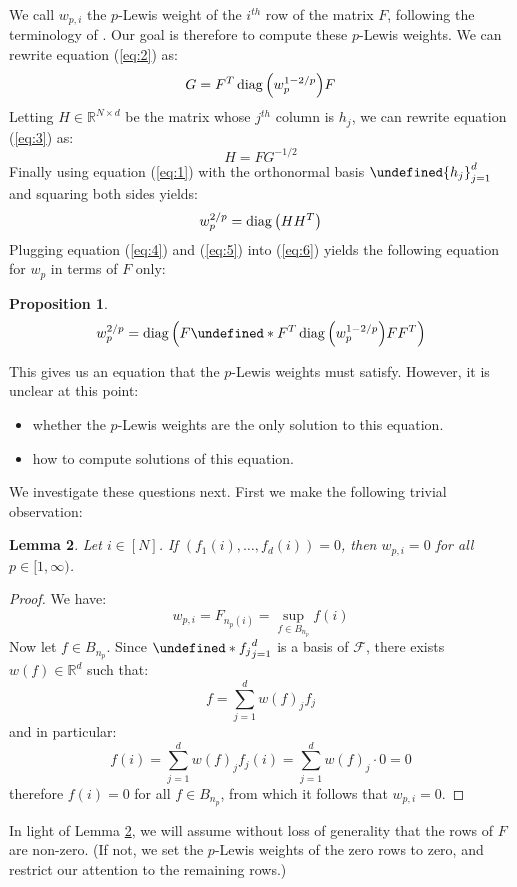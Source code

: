 \documentclass{article}
\theoremstyle{plain}
\newtheorem{lemma}{Lemma}
\newtheorem{proposition}[lemma]{Proposition} %
\theoremstyle{definition}
\theoremstyle{remark}
\let\brace\undefined
\DeclarePairedDelimiter{\brace}{\lbrace}{\rbrace}
\DeclarePairedDelimiter{\paren}{\lparen}{\rparen}
\newcommand{\R}{\mathbb{R}}
\DeclareMathOperator{\diag}{diag}
\begin{document}
We call $w_{p,i}$ the $p$-Lewis weight of the $i^{th}$ row of the matrix $F$, following the terminology of \cite{cohen2015lp}. Our goal is therefore to compute these $p$-Lewis weights. We can rewrite equation (\ref{eq:2}) as:
\begin{equation}
\label{eq:4}
    G = F^{T} \diag{\paren*{w_p^{1 - 2/p}}} F
\end{equation}
Letting $H \in \R^{N \times d}$ be the matrix whose $j^{th}$ column is $h_j$, we can rewrite equation (\ref{eq:3}) as:
\begin{equation}
\label{eq:5}
    H = F G^{-1/2}
\end{equation}
Finally using equation (\ref{eq:1}) with the orthonormal basis $\brace{h_j}_{j=1}^{d}$ and squaring both sides yields:
\begin{equation}
\label{eq:6}
    w_p^{2/p} = \diag{\paren*{H H^{T}}}
\end{equation}
Plugging equation (\ref{eq:4}) and (\ref{eq:5}) into (\ref{eq:6}) yields the following equation for $w_p$ in terms of $F$ only:
\begin{proposition}
\label{prop:2}
    \begin{equation*}
        w_p^{2/p} = \diag{\paren*{F \brace*{F^{T} \diag{\paren*{w_p^{1-2/p}}}F}F^{T}}}
    \end{equation*}
\end{proposition}
This gives us an equation that the $p$-Lewis weights must satisfy. However, it is unclear at this point:
\begin{itemize}
    \item whether the $p$-Lewis weights are the only solution to this equation.
    \item how to compute solutions of this equation.
\end{itemize}

We investigate these questions next. First we make the following trivial observation:
\begin{lemma}
\label{lem:5}
    Let $i \in [N]$. If $(f_1(i), \dotsc, f_d(i)) = 0$, then $w_{p,i} = 0$ for all $p \in [1,\infty)$.
\end{lemma}
\begin{proof}
    We have:
    \begin{equation*}
        w_{p, i} = F_{n_{p}(i)} = \sup_{f \in B_{n_p}} f(i)
    \end{equation*}
    Now let $f \in B_{n_p}$. Since $\brace*{f_j}_{j=1}^{d}$ is a basis of $\mathcal{F}$, there exists $w(f) \in \R^{d}$ such that:
    \begin{equation*}
        f = \sum_{j=1}^{d} w(f)_j f_j
    \end{equation*}
    and in particular:
    \begin{equation*}
        f(i) = \sum_{j=1}^{d} w(f)_j f_j(i) = \sum_{j=1}^{d} w(f)_j \cdot 0 = 0
    \end{equation*}
    therefore $f(i) = 0$ for all $f \in B_{n_p}$, from which it follows that $w_{p, i} = 0$.
\end{proof}
In light of Lemma \ref{lem:5}, we will assume without loss of generality that the rows of $F$ are non-zero. (If not, we set the $p$-Lewis weights of the zero rows to zero, and restrict our attention to the remaining rows.)
\end{document}
